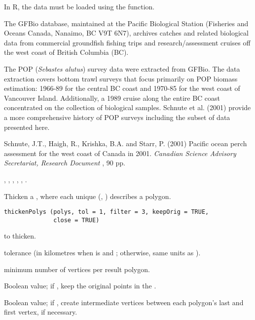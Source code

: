 \documentclass[letterpaper]{book}
\begin{document}
%
\begin{Note}\relax
In R, the data must be loaded using the  function.
\end{Note}
%
\begin{Source}\relax
The GFBio database, maintained at the Pacific Biological Station
(Fisheries and Oceans Canada, Nanaimo, BC V9T 6N7), archives catches
and related biological data from commercial groundfish fishing trips
and research/assessment cruises off the west coast of British Columbia
(BC).

The POP (\emph{Sebastes alutus}) survey data were extracted from
GFBio. The data extraction covers bottom trawl surveys that focus
primarily on POP biomass estimation: 1966-89 for the central BC coast
and 1970-85 for the west coast of Vancouver Island. Additionally, a
1989 cruise along the entire BC coast concentrated on the collection
of biological samples. Schnute et al. (2001) provide a more
comprehensive history of POP surveys including the subset of data
presented here.
\end{Source}
%
\begin{References}\relax
Schnute, J.T., Haigh, R., Krishka, B.A. and Starr, P. (2001) Pacific
ocean perch assessment for the west coast of Canada in 2001. \emph{Canadian
Science Advisory Secretariat, Research Document} , 90 pp.
\end{References}
%
\begin{SeeAlso}\relax
{},
,
,
,
,
.
\end{SeeAlso}
%
\begin{Description}\relax
Thicken a , where each unique (, )
describes a polygon.
\end{Description}
%
\begin{Usage}
\begin{verbatim}
thickenPolys (polys, tol = 1, filter = 3, keepOrig = TRUE,
              close = TRUE)
\end{verbatim}
\end{Usage}
%
\begin{Arguments}
\begin{ldescription}
\item[\code{polys}]  to thicken.
\item[\code{tol}] tolerance (in kilometres when  is
 and ; otherwise, same units as
).
\item[\code{filter}] minimum number of vertices per result polygon.
\item[\code{keepOrig}] Boolean value; if , keep the original
points in the .
\item[\code{close}] Boolean value; if , create intermediate vertices
between each polygon's last and first vertex, if necessary.
\end{ldescription}
\end{Arguments}
\end{document}
